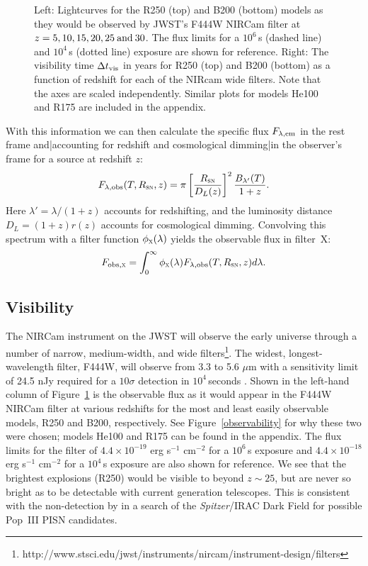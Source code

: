 \documentclass{thesis}
\newcommand{\RefFig}[1]{\mbox{Figure~\ref{#1}}}
\begin{document}
\begin{figure}[t!]
\begin{center}
{\begin{picture}
  \end{picture}}
\caption{\footnotesize Left: Lightcurves for the
  \citet{KasenWoosleyHeger2011} R250 (top) and B200 (bottom) models as
  they would be observed by JWST's F444W NIRCam filter at $z = 5, 10,
  15, 20, 25 \:{\rm and}\: 30$. The flux limits for a $10^6\,$s
  (dashed line) and $10^4\,$s (dotted line) exposure are shown for
  reference.  Right: The visibility time $\Delta t_{\rm vis}$ in years
  for R250 (top) and B200 (bottom) as a function of redshift for each
  of the NIRcam wide filters. Note that the axes are scaled
  independently.  Similar plots for models He100 and R175 are included
  in the appendix.}
   \label{visibility}
 \end{center}
\end{figure} 

With this information we can then calculate the specific flux
$F_{\lambda, \rm em}$ in the rest frame and|accounting for redshift
and cosmological dimming|in the observer's frame for a source at
redshift $z$:
\begin{equation}
F_{\lambda, \rm obs}(T,R_{\textsc{sn}}, z) = \pi
\left[\frac{R_{\textsc{sn}}}{D_L(z)}\right]^2
\frac{B_{\lambda'}(T)}{1+z}.
\end{equation}
Here $\lambda' = \lambda/(1+z)$ accounts for redshifting, and the
luminosity distance $D_L = (1+z) r(z)$ accounts for cosmological
dimming.  Convolving this spectrum with a filter function
$\phi_\textsc{x}(\lambda)$ yields the observable flux in filter~X:
\begin{equation}
F_{\rm obs, \textsc{x}} = \int_{0}^{\infty} \phi_\textsc{x}(\lambda)
F_{\lambda, \rm obs}(T,R_{\textsc{sn}}, z) d\lambda.
\end{equation}

\subsection{Visibility}
The NIRCam instrument on the JWST will observe the early universe
through a number of narrow, medium-width, and wide
filters\footnote{http://www.stsci.edu/jwst/instruments/nircam/instrument-design/filters}.
The widest, longest-wavelength filter, F444W, will observe from 3.3 to
5.6 $\mu$m with a sensitivity limit of 24.5 nJy required for a
$10\sigma$ detection in $10^4\,$seconds \citep{Gardneretal2006}. Shown
in the left-hand column of \RefFig{visibility} is the observable flux
as it would appear in the F444W NIRCam filter at various redshifts for
the most and least easily observable models, R250 and B200,
respectively. See \RefFig{observability} for why these two were
chosen; models He100 and R175 can be found in the appendix.  The flux
limits for the filter of $4.4 \times 10^{-19}$ erg s$^{-1}$ cm$^{-2}$
for a $10^6\,$s exposure and $4.4 \times 10^{-18}$ erg s$^{-1}$
cm$^{-2}$ for a $10^4\,$s exposure are also shown for reference.  We
see that the brightest explosions (R250) would be visible to beyond
$z\sim25$, but are never so bright as to be detectable with current
generation telescopes.  This is consistent with the non-detection by
\citet{Frostetal2009} in a search of the {\it Spitzer}/IRAC Dark Field
for possible Pop~III PISN candidates.
\end{document}
